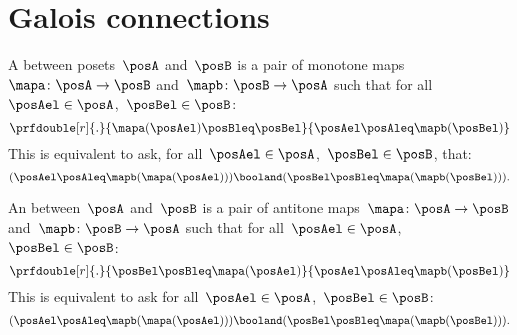 

\section{Galois connections}\label{subsec:galois-connections}

\begin{ctdefinition}
    A \emph{} between posets~$\posA$ and~$\posB$ is a pair of monotone maps~$\mapa\colon \posA\to \posB$ and~$\mapb\colon \posB\to \posA$ such that for all~$\posAel\in \posA$,~$\posBel\in \posB$:
    \begin{equation}
        \prfdouble[r]{.}{\mapa(\posAel) \posBleq \posBel}{\posAel \posAleq \mapb(\posBel)}
    \end{equation}
    This is equivalent to ask, for all~$\posAel\in \posA$,~$\posBel\in \posB$, that:
    \begin{equation}
        (\posAel\posAleq \mapb(\mapa(\posAel)))
        \booland (\posBel\posBleq \mapa(\mapb(\posBel))).
    \end{equation}
\end{ctdefinition}

\begin{ctdefinition}
    An \emph{} between~$\posA$ and~$\posB$ is a pair of antitone maps~$\mapa\colon \posA\to \posB$ and~$\mapb \colon \posB\to \posA$ such that for all~$\posAel\in \posA$,~$\posBel\in \posB$:
    \begin{equation}
        \prfdouble[r]{.}{\posBel \posBleq \mapa(\posAel)}{\posAel \posAleq \mapb(\posBel)}
    \end{equation}
    This is equivalent to ask for all~$\posAel\in \posA$,~$\posBel\in \posB$:
    \begin{equation}
        (\posAel \posAleq \mapb(\mapa(\posAel)))
        \booland  (\posBel \posBleq \mapa(\mapb(\posBel))).
    \end{equation}
\end{ctdefinition}

